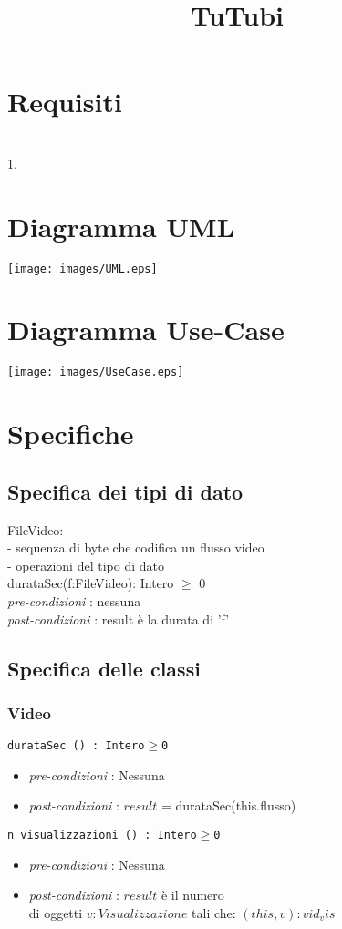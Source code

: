 \documentclass[12pt, letterpaper]{article}
\title{\textbf{TuTubi}}
\date{}
\newcommand{\code}[1]{\colorbox{light-gray}{\texttt{#1}}}
\newcommand{\id}{{\hphantom{ident}}}
\begin{document}
\maketitle\section{Requisiti}
\hphantom{a}\\
1. 

\newpage
\section{Diagramma UML}\begin{center}
    \texttt{[image: images/UML.eps]}
\end{center}
\newpage
\section{Diagramma Use-Case}\begin{center}
    \texttt{[image: images/UseCase.eps]}
\end{center}
\newpage
\section{Specifiche}
\subsection{Specifica dei tipi di dato}
FileVideo:      \\
\id- sequenza di byte che codifica un flusso video \\    
\id- operazioni del tipo di dato      \\ 
\id durataSec(f:FileVideo): Intero $\ge$ 0\\
\id \id \textit{pre-condizioni} :  nessuna\\
\id \id \textit{post-condizioni} : result è la durata di 'f'\\
\subsection{Specifica delle classi}
\subsubsection{Video}
\code{durataSec () : Intero$\ge$0}\begin{itemize}
    \item \textit{pre-condizioni} : Nessuna
    \item \textit{post-condizioni} : $result$ = durataSec(this.flusso)
\end{itemize}
\code{n\_visualizzazioni () : Intero$\ge$0}\begin{itemize}
    \item \textit{pre-condizioni} : Nessuna
    \item \textit{post-condizioni} : $result$ è il numero \\di oggetti $v:Visualizzazione$ tali che:
    $(this, v): vid_vis$
\end{itemize}
\end{document}
